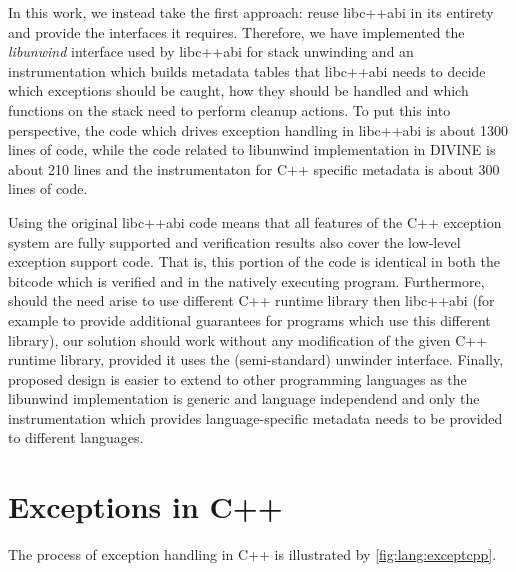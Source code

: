 In this work, we instead take the first approach: reuse
libc++abi in its entirety and provide the interfaces it
requires. Therefore, we have implemented the \emph{libunwind}
interface used by libc++abi for stack unwinding and an \llvm{}
instrumentation which builds metadata tables that libc++abi
needs to decide which exceptions should be caught, how they should be
handled and which functions on the stack need to perform cleanup
actions.
To put this into perspective, the code which drives exception handling in libc++abi is about 1300 lines of code, while the code related to libunwind implementation in DIVINE is about 210 lines and the instrumentaton for C++ specific metadata is about 300 lines of code.

Using the original libc++abi code means that all features of
the C++ exception system are fully supported and verification results
also cover the low-level exception support code. That is, this portion
of the code is identical in both the bitcode which is verified and in
the natively executing program.
Furthermore, should the need arise to use different C++ runtime library then
libc++abi (for example to provide additional guarantees for programs
which use this different library), our solution should work without any
modification of the given C++ runtime library, provided it uses the
(semi-standard) unwinder interface.
Finally, proposed design is easier to extend to other programming
languages as the libunwind implementation is generic and language
independend and only the instrumentation which provides language-specific
metadata needs to be provided to different languages.

\section{Exceptions in C++}\label{sec:exceptions}

The process of exception handling in C++ is illustrated by \autoref{fig:lang:exceptcpp}.

